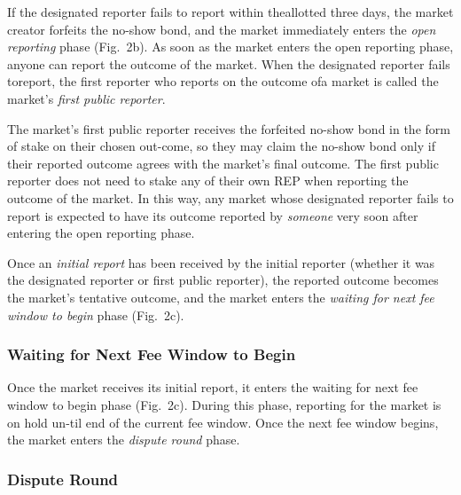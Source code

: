 \documentclass[12pt,floatfix,reprint,nofootinbib,amsmath,amssymb,epsfig,pre,floats,letterpaper,groupedaffiliation]{revtex4-1}
\theoremstyle{definition}
\theoremstyle{definition}
\begin{document}
If the designated reporter fails to report within the\linebreak allotted three days, the market creator forfeits the no-show bond, and the market immediately enters the \textit{open reporting} phase (Fig.~2b). As soon as the market enters the open reporting phase, anyone can report the outcome of the market. When the designated reporter fails to\pagebreak \linebreak report, the first reporter who reports on the outcome of\linebreak a market is called the market's \textit{first public reporter}.

The market's first public reporter receives the forfeited no-show bond in the form of stake on their chosen out-\linebreak come, so they may claim the no-show bond only if their reported outcome agrees with the market's final outcome. The first public reporter does not need to stake any of their own REP when reporting the outcome of the mar\-ket. In this way, any market whose designated reporter fails to report is expected to have its outcome reported by \textit{someone} very soon after entering the open reporting phase.

Once an \textit{initial report} has been received by the ini\-tial reporter (whether it was the designated reporter or first public reporter), the reported outcome becomes the market's tentative outcome, and the market enters the \textit{waiting for next fee window to begin} phase (Fig.~2c).

\subsubsection{Waiting for Next Fee Window to Begin}

Once the market receives its initial report, it enters the waiting for next fee window to begin phase (Fig.~2c). During this phase, reporting for the market is on hold un-\linebreak til end of the current fee window. Once the next fee win\-dow begins, the market enters the \textit{dispute round} phase.

\subsubsection{Dispute Round}
\end{document}
